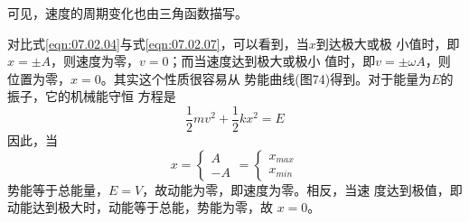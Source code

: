 可见，速度的周期变化也由三角函数描写。

对比式\eqref{eqn:07.02.04}与式\eqref{eqn:07.02.07}，可以看到，当$ x $到达极大或极
小值时，即$  x = \pm A   $，则速度为零，$  v = 0   $；而当速度达到极大或极小
值时，即$  v = \pm \omega A   $，则位置为零，$  x = 0   $。其实这个性质很容易从
势能曲线(图74)得到。对于能量为$ E $的振子，它的机械能守恒
方程是
\begin{equation*}
	\frac { 1 } { 2 } m v ^ { 2 } + \frac { 1 } { 2 } k x ^ { 2 } = E
\end{equation*}
因此，当
\begin{equation*}
	x =
	\begin{cases}
		A \\
		-A
	\end{cases}
	=
	\begin{cases}
		x _ { max } \\
		x _ { min }
	\end{cases}
\end{equation*}
势能等于总能量，$  E = V   $，故动能为零，即速度为零。相反，当速
度达到极值，即动能达到极大时，动能等于总能，势能为零，故
$ x = 0   $。
